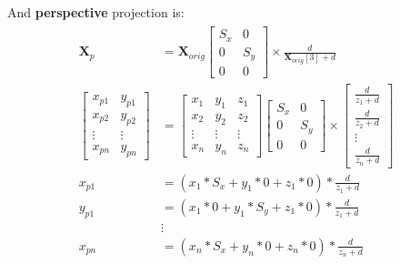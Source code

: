 \documentclass[10pt,b5paper,titlepage]{book}
\begin{document}
\\
And \textbf{perspective} projection is:
\begin{eqnarray}
    \begin{aligned}
        \mathbf{X}_p &= \mathbf{X}_{orig}
        \begin{bmatrix}
            S_x & 0 \\
            0 & S_y \\
            0 & 0
        \end{bmatrix} \times \frac{d}{\mathbf{X}_{orig}[3] + d} \\
        \begin{bmatrix}
            x_{p1} & y_{p1} \\
            x_{p2} & y_{p2} \\
            \vdots & \vdots \\
            x_{pn} & y_{pn}
        \end{bmatrix}
        &=
        \begin{bmatrix}
            x_1 & y_1 & z_1 \\
            x_2 & y_2 & z_2 \\
            \vdots & \vdots & \vdots \\
            x_n & y_n & z_n
        \end{bmatrix}
        \begin{bmatrix}
            S_x & 0 \\
            0 & S_y \\
            0 & 0
        \end{bmatrix} \times
        \begin{bmatrix}
            \frac{d}{z_1 + d} \\
            \frac{d}{z_2 + d} \\
            \vdots \\
            \frac{d}{z_n + d}
        \end{bmatrix} \\
        x_{p1} &= (x_1 * S_x + y_1 * 0 + z_1 * 0) * \frac{d}{z_1 + d} \\
        y_{p1} &= (x_1 * 0 + y_1 * S_y + z_1 * 0) * \frac{d}{z_1 + d} \\
               & \vdots \\
        x_{pn} &= (x_n * S_x + y_n * 0 + z_n * 0) * \frac{d}{z_n + d} \\
    \end{aligned}
\end{eqnarray}
\end{document}
